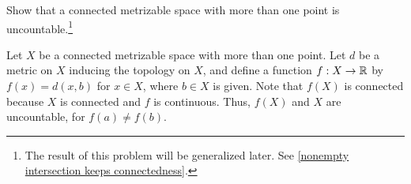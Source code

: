 \begin{prob}\label{Particular uncountable space - connected "metrizable" spaces}
    Show that a connected metrizable space with more than one point is uncountable.\footnote{The result of this problem will be generalized later. See \cref{nonempty intersection keeps connectedness}.}
\end{prob}
\begin{sol}
    Let $X$ be a connected metrizable space with more than one point.
    Let $d$ be a metric on $X$ inducing the topology on $X$, and define a function $f: X\rightarrow{\mathbb{R}}$ by $f(x)=d(x, b)$ for $x\in X$, where $b\in X$ is given.
    Note that $f(X)$ is connected because $X$ is connected and $f$ is continuous.
    Thus, $f(X)$ and $X$ are uncountable, for $f(a)\neq f(b)$.
\end{sol}